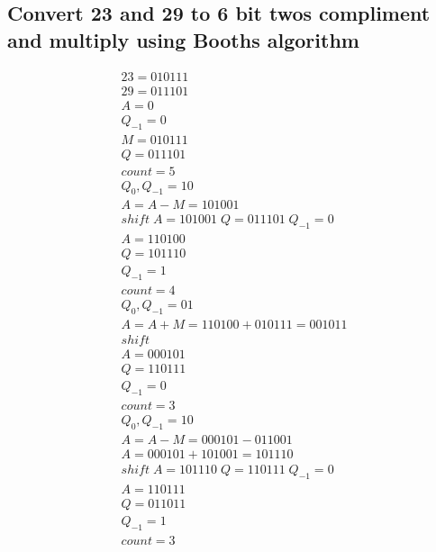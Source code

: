 \documentclass[12pt, a4paper]{article}
\begin{document}
		\subsection{Convert 23 and 29 to 6 bit twos compliment and multiply using Booths algorithm}
				\begin{align*}
					23=010111\\
					29=011101\\
					A=0\\
					Q_{-1}=0\\
					M=010111\\
					Q=011101\\
					count=5\\[4mm]
					Q_0,Q_{-1}=10\\
					A=A-M=101001\\
					shift\; A=101001\; Q=011101\; Q_{-1}=0\\
					A=110100\\
					Q=101110\\
					Q_{-1}=1\\
					count=4\\[4mm]
					Q_0,Q_{-1}=01\\
					A=A+M=110100+010111=001011\\
					shift\\
					A=000101\\
					Q=110111\\
					Q_{-1}=0\\
					count=3\\[4mm]
					Q_0,Q_{-1}=10\\
					A=A-M=000101-011001\\
					A=000101+101001=101110\\
					shift\; A=101110\; Q=110111\; Q_{-1}=0\\
					A=110111\\
					Q=011011\\
					Q_{-1}=1\\
					count=3
				\end{align*}
\end{document}
